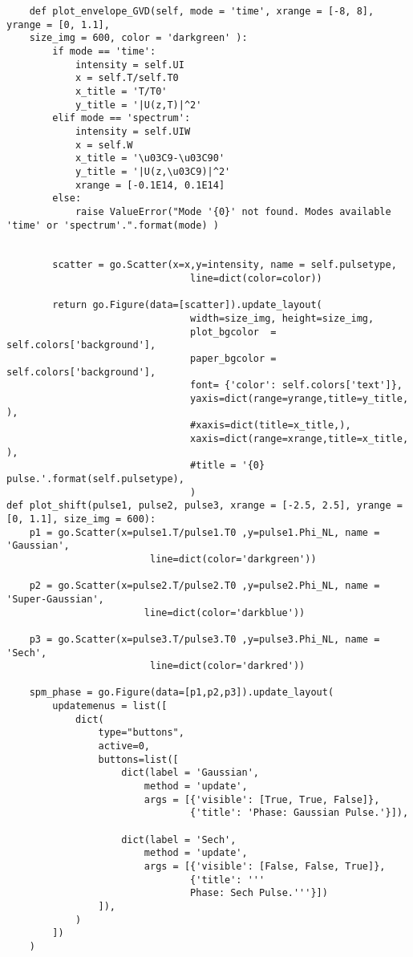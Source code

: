 \begin{verbatim}
    def plot_envelope_GVD(self, mode = 'time', xrange = [-8, 8],  yrange = [0, 1.1],
    size_img = 600, color = 'darkgreen' ):
        if mode == 'time':
            intensity = self.UI
            x = self.T/self.T0
            x_title = 'T/T0'
            y_title = '|U(z,T)|^2'
        elif mode == 'spectrum':
            intensity = self.UIW
            x = self.W
            x_title = '\u03C9-\u03C90'
            y_title = '|U(z,\u03C9)|^2'
            xrange = [-0.1E14, 0.1E14]
        else:
            raise ValueError("Mode '{0}' not found. Modes available 'time' or 'spectrum'.".format(mode) )
        

        scatter = go.Scatter(x=x,y=intensity, name = self.pulsetype,
                                line=dict(color=color))
        
        return go.Figure(data=[scatter]).update_layout(
                                width=size_img, height=size_img,
                                plot_bgcolor  = self.colors['background'],
                                paper_bgcolor = self.colors['background'],
                                font= {'color': self.colors['text']},
                                yaxis=dict(range=yrange,title=y_title, ), 
                                #xaxis=dict(title=x_title,), 
                                xaxis=dict(range=xrange,title=x_title, ), 
                                #title = '{0} pulse.'.format(self.pulsetype),
                                )
def plot_shift(pulse1, pulse2, pulse3, xrange = [-2.5, 2.5], yrange = [0, 1.1], size_img = 600):
    p1 = go.Scatter(x=pulse1.T/pulse1.T0 ,y=pulse1.Phi_NL, name = 'Gaussian',
                         line=dict(color='darkgreen'))

    p2 = go.Scatter(x=pulse2.T/pulse2.T0 ,y=pulse2.Phi_NL, name = 'Super-Gaussian',
                        line=dict(color='darkblue'))

    p3 = go.Scatter(x=pulse3.T/pulse3.T0 ,y=pulse3.Phi_NL, name = 'Sech',
                         line=dict(color='darkred'))

    spm_phase = go.Figure(data=[p1,p2,p3]).update_layout( 
        updatemenus = list([
            dict(
                type="buttons",
                active=0,
                buttons=list([   
                    dict(label = 'Gaussian',
                        method = 'update',
                        args = [{'visible': [True, True, False]},
                                {'title': 'Phase: Gaussian Pulse.'}]), 

                    dict(label = 'Sech',
                        method = 'update',
                        args = [{'visible': [False, False, True]},
                                {'title': '''
                                Phase: Sech Pulse.'''}])  
                ]),
            )
        ])
    )



\end{verbatim}
